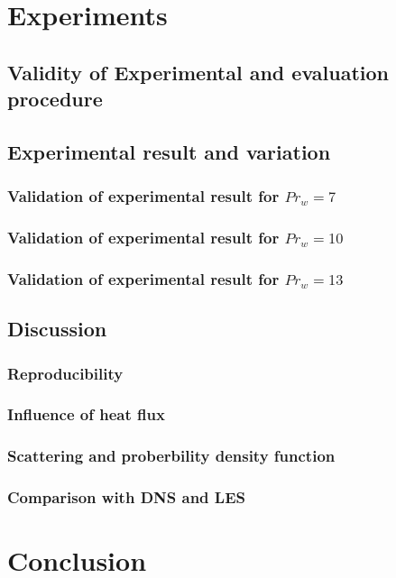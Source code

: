 \documentclass[12pt,oneside]{jbook}
\begin{document}
\chapter{Experiments}
\section{Validity of Experimental and evaluation procedure}
\section{Experimental result and variation}
\subsection{Validation of experimental result for $Pr_{w}=7$}
\subsection{Validation of experimental result for $Pr_{w}=10$}
\subsection{Validation of experimental result for $Pr_{w}=13$}

\section{Discussion}
\subsection{Reproducibility}
\subsection{Influence of heat flux}
\subsection{Scattering and proberbility density function}
\subsection{Comparison with DNS and LES}
\chapter{Conclusion}


\appendix




\end{document}
